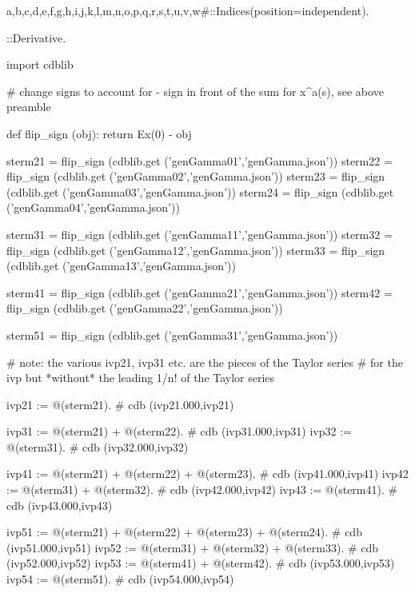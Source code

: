 \documentclass[12pt]{cdblatex}
\begin{document}
\begin{cadabra}
   {a,b,c,d,e,f,g,h,i,j,k,l,m,n,o,p,q,r,s,t,u,v,w#}::Indices(position=independent).

   \nabla{#}::Derivative.

   import cdblib

   # change signs to account for - sign in front of the sum for x^a(s), see above preamble

   def flip_sign (obj):
       return Ex(0) - obj

   sterm21 = flip_sign (cdblib.get ('genGamma01','genGamma.json'))
   sterm22 = flip_sign (cdblib.get ('genGamma02','genGamma.json'))
   sterm23 = flip_sign (cdblib.get ('genGamma03','genGamma.json'))
   sterm24 = flip_sign (cdblib.get ('genGamma04','genGamma.json'))

   sterm31 = flip_sign (cdblib.get ('genGamma11','genGamma.json'))
   sterm32 = flip_sign (cdblib.get ('genGamma12','genGamma.json'))
   sterm33 = flip_sign (cdblib.get ('genGamma13','genGamma.json'))

   sterm41 = flip_sign (cdblib.get ('genGamma21','genGamma.json'))
   sterm42 = flip_sign (cdblib.get ('genGamma22','genGamma.json'))

   sterm51 = flip_sign (cdblib.get ('genGamma31','genGamma.json'))

   # note: the various ivp21, ivp31  etc. are the pieces of the Taylor series
   #       for the ivp but *without* the leading 1/n! of the Taylor series

   ivp21 := @(sterm21).                                          # cdb (ivp21.000,ivp21)

   ivp31 := @(sterm21) + @(sterm22).                             # cdb (ivp31.000,ivp31)
   ivp32 := @(sterm31).                                          # cdb (ivp32.000,ivp32)

   ivp41 := @(sterm21) + @(sterm22) + @(sterm23).                # cdb (ivp41.000,ivp41)
   ivp42 := @(sterm31) + @(sterm32).                             # cdb (ivp42.000,ivp42)
   ivp43 := @(sterm41).                                          # cdb (ivp43.000,ivp43)

   ivp51 := @(sterm21) + @(sterm22) + @(sterm23) + @(sterm24).   # cdb (ivp51.000,ivp51)
   ivp52 := @(sterm31) + @(sterm32) + @(sterm33).                # cdb (ivp52.000,ivp52)
   ivp53 := @(sterm41) + @(sterm42).                             # cdb (ivp53.000,ivp53)
   ivp54 := @(sterm51).                                          # cdb (ivp54.000,ivp54)


\end{cadabra}
\end{document}
